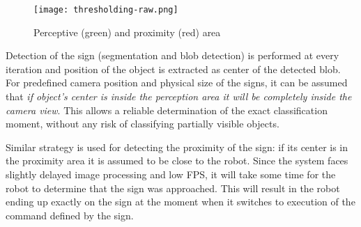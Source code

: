 \begin{figure}[th!]
	\centering
		\texttt{[image: thresholding-raw.png]}
	\caption{Perceptive (green) and proximity (red) area}
	\label{fig:camera-view-areas}
\end{figure}

Detection of the sign (segmentation and blob detection) is performed at every iteration and position of the object is extracted as center of the detected blob. For predefined camera position and physical size of the signs, it can be assumed that \textit{if object's center is inside the perception area it will be completely inside the camera view}. This allows a reliable determination of the exact classification moment, without any risk of classifying partially visible objects.

Similar strategy is used for detecting the proximity of the sign: if its center is in the proximity area it is assumed to be close to the robot. Since the system faces slightly delayed image processing and low FPS, it will take some time for the robot to determine that the sign was approached. This will result in the robot ending up exactly on the sign at the moment when it switches to execution of the command defined by the sign.
